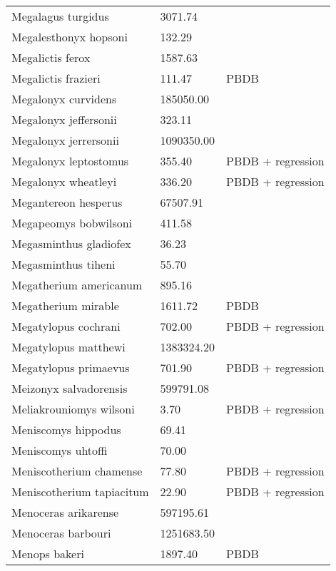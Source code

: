 \begin{longtable}{p{} p{} p{}}
    Megalagus turgidus & 3071.74 & \cite{Tomiya2013} \\ 
    Megalesthonyx hopsoni & 132.29 & \cite{Hay1916} \\ 
    Megalictis ferox & 1587.63 & \cite{Tomiya2013} \\ 
    Megalictis frazieri & 111.47 & PBDB \\ 
    Megalonyx curvidens & 185050.00 & \cite{McDonald1995} \\ 
    Megalonyx jeffersonii & 323.11 & \cite{Smith2004} \\ 
    Megalonyx jerrersonii & 1090350.00 & \cite{Martin2002a} \\ 
    Megalonyx leptostomus & 355.40 & PBDB + regression \\ 
    Megalonyx wheatleyi & 336.20 & PBDB + regression \\ 
    Megantereon hesperus & 67507.91 & \cite{Tomiya2013} \\ 
    Megapeomys bobwilsoni & 411.58 & \cite{Tomiya2013} \\ 
    Megasminthus gladiofex & 36.23 & \cite{Tomiya2013} \\ 
    Megasminthus tiheni & 55.70 & \cite{Tomiya2013} \\ 
    Megatherium americanum & 895.16 & \cite{Smith2004} \\ 
    Megatherium mirable & 1611.72 & PBDB \\ 
    Megatylopus cochrani & 702.00 & PBDB + regression \\ 
    Megatylopus matthewi & 1383324.20 & \cite{Tomiya2013} \\ 
    Megatylopus primaevus & 701.90 & PBDB + regression \\ 
    Meizonyx salvadorensis & 599791.08 & \cite{Brook2004a} \\ 
    Meliakrouniomys wilsoni & 3.70 & PBDB + regression \\ 
    Meniscomys hippodus & 69.41 & \cite{Tomiya2013} \\ 
    Meniscomys uhtoffi & 70.00 & \cite{McKenna2011} \\ 
    Meniscotherium chamense & 77.80 & PBDB + regression \\ 
    Meniscotherium tapiacitum & 22.90 & PBDB + regression \\ 
    Menoceras arikarense & 597195.61 & \cite{Tomiya2013} \\ 
    Menoceras barbouri & 1251683.50 & \cite{Tomiya2013} \\ 
    Menops bakeri & 1897.40 & PBDB \\ 

\end{longtable}
